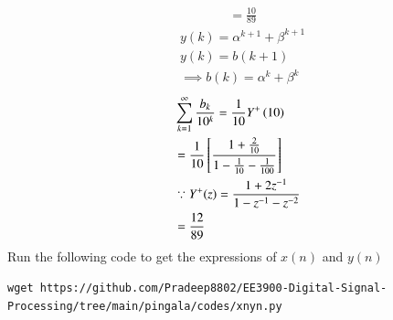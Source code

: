 \documentclass[journal,12pt,twocolumn]{IEEEtran}
\renewcommand\thesection{\arabic{section}}
\begin{document}
\begin{enumerate}[label=\thesection.\arabic*,ref=\thesection.\theenumi]
\begin{align}
	&=\frac{10}{89}
\end{align}
\begin{align}
	&y(k)=\alpha^{k+1}+\beta^{k+1}\\
	&y(k)=b(k+1)\\
	&\implies b(k)=\alpha^{k}+\beta^{k}
\end{align}
\begin{align}
	&\sum_{k=1}^{\infty}\frac{b_k}{10^k} =\frac{1}{10}Y^{+}\left({10}\right)\\
	&=\frac{1}{10}\left[\frac{1+\frac{2}{10}}{1-\frac{1}{10}-\frac{1}{100}}\right]\\
	&\because Y^{+}(z)=\frac{1+2z^{-1}}{1-z^{-1}-z^{-2}}\\
	&=\frac{12}{89}
\end{align}
Run the following code to get the expressions of $x(n)$ and $y(n)$
\begin{lstlisting}
wget https://github.com/Pradeep8802/EE3900-Digital-Signal-Processing/tree/main/pingala/codes/xnyn.py
\end{lstlisting}
\end{enumerate}
\end{document}
